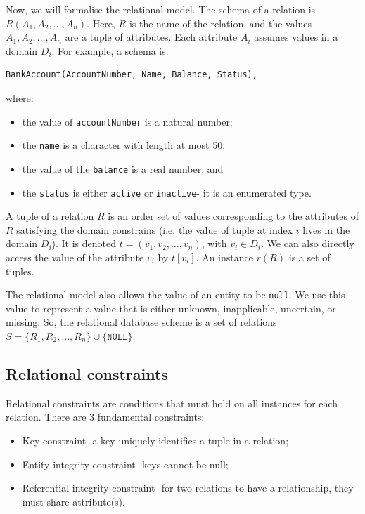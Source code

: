 \documentclass[a4paper, openany]{memoir}
\begin{document}
Now, we will formalise the relational model. The schema of a relation is $R(A_1, A_2, \dots, A_n)$. Here, $R$ is the name of the relation, and the values $A_1, A_2, \dots, A_n$ are a tuple of attributes. Each attribute $A_i$ assumes values in a domain $D_i$. For example, a schema is: 
\begin{verbatim}
BankAccount(AccountNumber, Name, Balance, Status),
\end{verbatim}
where:
\begin{itemize}
    \item the value of \texttt{accountNumber} is a natural number;
    \item the \texttt{name} is a character with length at most 50;
    \item the value of the \texttt{balance} is a real number; and
    \item the \texttt{status} is either \texttt{active} or \texttt{inactive}- it is an enumerated type.
\end{itemize}

A tuple of a relation $R$ is an order set of values corresponding to the attributes of $R$ satisfying the domain constrains (i.e. the value of tuple at index $i$ lives in the domain $D_i$). It is denoted $t = (v_1, v_2, \dots, v_n)$, with $v_i \in D_i$. We can also directly access the value of the attribute $v_i$ by $t[v_i]$. An instance $r(R)$ is a set of tuples.

The relational model also allows the value of an entity to be \texttt{null}. We use this value to represent a value that is either unknown, inapplicable, uncertain, or missing. So, the relational database scheme is a set of relations $S = \{R_1, R_2, \dots, R_n\} \cup \{\texttt{NULL}\}$.

\subsection{Relational constraints}
Relational constraints are conditions that must hold on all instances for each relation. There are 3 fundamental constraints:
\begin{itemize}
    \item Key constraint- a key uniquely identifies a tuple in a relation;
    \item Entity integrity constraint- keys cannot be null;
    \item Referential integrity constraint- for two relations to have a relationship, they must share attribute(s).
\end{itemize}
\end{document}

